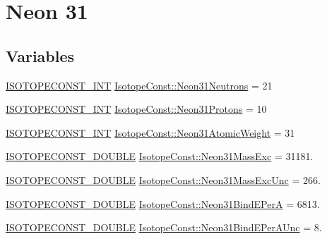 \hypertarget{group___isotope_const-_neon-_ne31}{}\section{Neon 31}
\label{group___isotope_const-_neon-_ne31}
\subsection*{Variables}
\begin{DoxyCompactItemize}
\item 
\mbox{\hyperlink{group___isotope_const-_macros_ga5f18360b3e99483a35c32d789e62621c}{I\+S\+O\+T\+O\+P\+E\+C\+O\+N\+S\+T\+\_\+\+I\+NT}} \mbox{\hyperlink{group___isotope_const-_neon-_ne31_ga8fa71fa9f750f4639e79b77c4a361f45}{Isotope\+Const\+::\+Neon31\+Neutrons}} = 21
\item 
\mbox{\hyperlink{group___isotope_const-_macros_ga5f18360b3e99483a35c32d789e62621c}{I\+S\+O\+T\+O\+P\+E\+C\+O\+N\+S\+T\+\_\+\+I\+NT}} \mbox{\hyperlink{group___isotope_const-_neon-_ne31_gafbb83772cbd143a983e6f46540f95d50}{Isotope\+Const\+::\+Neon31\+Protons}} = 10
\item 
\mbox{\hyperlink{group___isotope_const-_macros_ga5f18360b3e99483a35c32d789e62621c}{I\+S\+O\+T\+O\+P\+E\+C\+O\+N\+S\+T\+\_\+\+I\+NT}} \mbox{\hyperlink{group___isotope_const-_neon-_ne31_ga8a0d9f4ed380d73584edfab5afca875e}{Isotope\+Const\+::\+Neon31\+Atomic\+Weight}} = 31
\item 
\mbox{\hyperlink{group___isotope_const-_macros_ga8f45a7272ce02c0b4c65c44636ed719a}{I\+S\+O\+T\+O\+P\+E\+C\+O\+N\+S\+T\+\_\+\+D\+O\+U\+B\+LE}} \mbox{\hyperlink{group___isotope_const-_neon-_ne31_ga06c9088d1dee01aa9aacd40ddd4807df}{Isotope\+Const\+::\+Neon31\+Mass\+Exc}} = 31181.
\item 
\mbox{\hyperlink{group___isotope_const-_macros_ga8f45a7272ce02c0b4c65c44636ed719a}{I\+S\+O\+T\+O\+P\+E\+C\+O\+N\+S\+T\+\_\+\+D\+O\+U\+B\+LE}} \mbox{\hyperlink{group___isotope_const-_neon-_ne31_ga978e7a5085d09d81b863b4d2e28e8fc2}{Isotope\+Const\+::\+Neon31\+Mass\+Exc\+Unc}} = 266.
\item 
\mbox{\hyperlink{group___isotope_const-_macros_ga8f45a7272ce02c0b4c65c44636ed719a}{I\+S\+O\+T\+O\+P\+E\+C\+O\+N\+S\+T\+\_\+\+D\+O\+U\+B\+LE}} \mbox{\hyperlink{group___isotope_const-_neon-_ne31_gabe1eb51dbc80b4126f58d905dde73b38}{Isotope\+Const\+::\+Neon31\+Bind\+E\+PerA}} = 6813.
\item 
\mbox{\hyperlink{group___isotope_const-_macros_ga8f45a7272ce02c0b4c65c44636ed719a}{I\+S\+O\+T\+O\+P\+E\+C\+O\+N\+S\+T\+\_\+\+D\+O\+U\+B\+LE}} \mbox{\hyperlink{group___isotope_const-_neon-_ne31_ga1ea5e3e2efa57a51d1914dc104c42bdc}{Isotope\+Const\+::\+Neon31\+Bind\+E\+Per\+A\+Unc}} = 8.

\end{DoxyCompactItemize}
